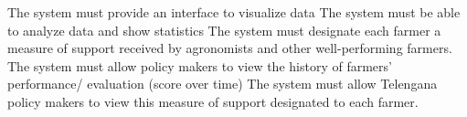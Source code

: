 \begin{itemize}
\begin{itemize}
 The system must provide an interface to visualize data
 The system must be able to analyze data and show statistics
 The system must designate each farmer a measure of support received by agronomists and other well-performing farmers.
 The system must allow policy makers to view the history of farmers’ performance/ evaluation (score over time)
 The system must allow Telengana policy makers to view this measure of support designated to each farmer.
\end{itemize}



\end{itemize}
